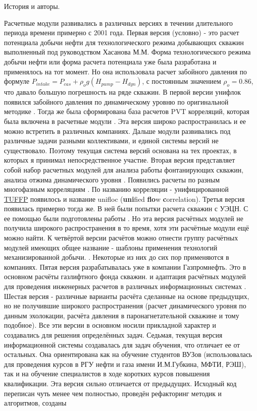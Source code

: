 \newpage
История и авторы.

Расчетные модули \unf{} развивались в различных версиях в течении длительного периода времени примерно с 2001 года. Первая версия (условно) - это расчет потенциала добычи нефти для технологического режима добывающих скважин выполненный под руководством Хасанова М.М. Форма технологического режима добычи нефти или форма расчета потенциала уже была разработана и применялось на тот момент. Но она использовала расчет забойного давления по формуле \(P_{intake} = P_{cas}+\rho_{o}g(H_{pump}-H_{dyn})\),  с постоянным значением \(\rho_{o} = 0.86\), что давало большую погрешность на ряде скважин. В первой версии унифлок появился забойного давления по динамическому уровню по оригинальной методике \cite{Khasanov_TR_2006}. Тогда же была сформирована база расчетов PVT корреляций, которая была включена в расчетные модули \cite{Yukos_PVT_2002}. Эта версия широко распространилась и ее можно встретить в различных компаниях. Дальше модули развивались под различные задачи разными коллективами, и единой системы версий не существовало. Поэтому текущая система версий основана на тех проектах, в которых я принимал непосредственное участие. Вторая версия представляет собой набор расчетных модулей для анализа работы фонтанирующих скважин, анализа отжима динамического уровня \cite{Khasanov_depress_test_2010, Khasanov_depress_test_SPE_2010}. Появились расчеты по разным многофазным корреляциям \cite{Khasanov_Unified_SPE_2006,Khabibullin_self_flow_2006}. По названию корреляции - унифицированной \href{http://www.tuffp.utulsa.edu/}{TUFFP} появилось и название unifloc (\textbf{uni}fied \textbf{flo}w \textbf{c}orrelation).  Третья версия появилась примерно тогда же. В ней были попытки расчета скважин с УЭЦН. С ее помощью были подготовлены работы \cite{SPE_117414_2008, SPE_117415_2008, SPE_120628}. Но эта версия расчётных модулей не получила широкого распространения в то время, хотя эти расчётные модули ещё можно найти. К четвёртой версии расчётов можно отнести группу расчётных модулей имеющих общее название - шаблоны применения технологий механизированной добычи. \cite{AL_appl_patt_2007,AL_appl_patt_Vankor_2007}. Некоторые из них до сих пор применяются в компаниях. Пятая версия разрабатывалась уже в компании Газпромнефть. Это в основном расчёты газлифтного фонда скважин. и адаптация расчётных модулей для проведения инженерных расчетов в различных информационных системах \cite{Burtzev_Orenbung_gaslift_2015, offshore_gaslift_2015} . Шестая версия - различные варианты расчёта сделанные на основе предыдущих, но не получившие широкого распространения (расчет динамического уровня по данным эхолокации, расчёта давления в паронагнетательной скважине и тому подобное).  Все эти версии в основном носили прикладной характер и создавались для решения определённых задач. Седьмая, текущая версия информационной системы создавалась для задач обучения, что отличает ее от остальных. Она ориентирована как на обучение студентов ВУЗов (использовалась для проведения курсов в РГУ нефти и газа имени И.М.Губкина, МФТИ, РЭШ), так и на обучение специалистов в ходе коротких курсов повышения квалификации. Эта версия сильно отличается от предыдущих. Исходный код переписан чуть менее чем полностью, проведён рефакторинг методик и алгоритмов, созданы 